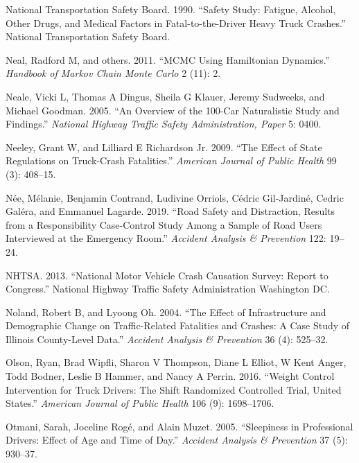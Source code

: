 \documentclass[12pt]{book}
\numberwithin{equation}{chapter}
\begin{document}
\leavevmode\hypertarget{ref-ntsb1990}{}%
National Transportation Safety Board. 1990. ``Safety Study: Fatigue, Alcohol, Other Drugs, and Medical Factors in Fatal-to-the-Driver Heavy Truck Crashes.'' National Transportation Safety Board.

\leavevmode\hypertarget{ref-neal2011mcmc}{}%
Neal, Radford M, and others. 2011. ``MCMC Using Hamiltonian Dynamics.'' \emph{Handbook of Markov Chain Monte Carlo} 2 (11): 2.

\leavevmode\hypertarget{ref-neale2005overview}{}%
Neale, Vicki L, Thomas A Dingus, Sheila G Klauer, Jeremy Sudweeks, and Michael Goodman. 2005. ``An Overview of the 100-Car Naturalistic Study and Findings.'' \emph{National Highway Traffic Safety Administration, Paper} 5: 0400.

\leavevmode\hypertarget{ref-neeley2009effect}{}%
Neeley, Grant W, and Lilliard E Richardson Jr. 2009. ``The Effect of State Regulations on Truck-Crash Fatalities.'' \emph{American Journal of Public Health} 99 (3): 408--15.

\leavevmode\hypertarget{ref-nee2019road}{}%
Née, Mélanie, Benjamin Contrand, Ludivine Orriols, Cédric Gil-Jardiné, Cedric Galéra, and Emmanuel Lagarde. 2019. ``Road Safety and Distraction, Results from a Responsibility Case-Control Study Among a Sample of Road Users Interviewed at the Emergency Room.'' \emph{Accident Analysis \& Prevention} 122: 19--24.

\leavevmode\hypertarget{ref-nhtsa2013national}{}%
NHTSA. 2013. ``National Motor Vehicle Crash Causation Survey: Report to Congress.'' National Highway Traffic Safety Administration Washington DC.

\leavevmode\hypertarget{ref-noland2004effect}{}%
Noland, Robert B, and Lyoong Oh. 2004. ``The Effect of Infrastructure and Demographic Change on Traffic-Related Fatalities and Crashes: A Case Study of Illinois County-Level Data.'' \emph{Accident Analysis \& Prevention} 36 (4): 525--32.

\leavevmode\hypertarget{ref-olson2016weight}{}%
Olson, Ryan, Brad Wipfli, Sharon V Thompson, Diane L Elliot, W Kent Anger, Todd Bodner, Leslie B Hammer, and Nancy A Perrin. 2016. ``Weight Control Intervention for Truck Drivers: The Shift Randomized Controlled Trial, United States.'' \emph{American Journal of Public Health} 106 (9): 1698--1706.

\leavevmode\hypertarget{ref-otmani2005sleepiness}{}%
Otmani, Sarah, Joceline Rogé, and Alain Muzet. 2005. ``Sleepiness in Professional Drivers: Effect of Age and Time of Day.'' \emph{Accident Analysis \& Prevention} 37 (5): 930--37.
\end{document}
